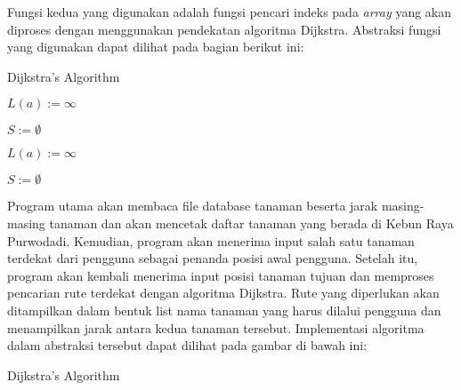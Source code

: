 \documentclass[conference]{IEEEtran}
\begin{document}
    Fungsi kedua yang digunakan adalah fungsi pencari indeks
    pada \textit{array} yang akan diproses dengan menggunakan pendekatan
    algoritma Dijkstra. Abstraksi fungsi yang digunakan
    dapat dilihat pada bagian berikut ini:

    \begin{algorithm}
        \caption{Dijkstra's Algorithm}\label{alg:three}

        


        $L(a) := \infty$

        $S := \emptyset$

        $L(a) := \infty$

        $S := \emptyset$

    \end{algorithm}

    Program utama akan membaca file database tanaman
    beserta jarak masing-masing tanaman dan akan mencetak
    daftar tanaman yang berada di Kebun Raya Purwodadi.
    Kemudian, program akan menerima input salah satu tanaman
    terdekat dari pengguna sebagai penanda posisi awal pengguna.
    Setelah itu, program akan kembali menerima input posisi
    tanaman tujuan dan memproses pencarian rute terdekat dengan
    algoritma Dijkstra. Rute yang diperlukan akan ditampilkan
    dalam bentuk list nama tanaman yang harus dilalui pengguna
    dan menampilkan jarak antara kedua tanaman tersebut.
    Implementasi algoritma dalam abstraksi tersebut dapat dilihat
    pada gambar di bawah ini:

    \begin{algorithm}
        \caption{Dijkstra's Algorithm}\label{alg:four}

        

        
    \end{algorithm}
\end{document}
